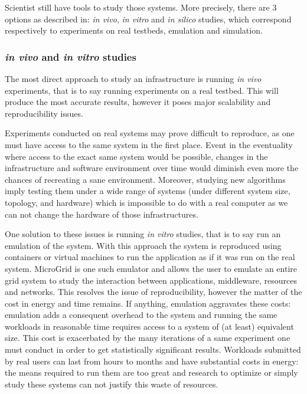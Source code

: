 Scientist still have tools to study those systems. More precisely, there are 3
options as described in\cite{legrand2015scheduling}: \textit{in vivo},
\textit{in vitro} and \textit{in silico} studies, which correspond respectively
to experiments on real testbeds, emulation and simulation.  


\subsubsection{\textit{in vivo} and \textit{in vitro} studies}

The most direct approach to study an infrastructure is running \textit{in vivo}
experiments, that is to say running experiments on a real testbed. This will
produce the most accurate results, however it poses major scalability and
reproducibility issues.

Experiments conducted on real systems may prove difficult to reproduce, as one
must have access to the same system in the first place. Event in the
eventuality where access to the exact same system would be possible, changes in
the infrastructure and software environment over time would diminish even more
the chances of recreating a sane environment. Moreover, studying new algorithms
imply testing them under a wide range of systems (under different system size,
topology, and hardware) which is impossible to do with a real computer as we
can not change the hardware of those infrastructures.

One solution to these issues is running \textit{in vitro} studies, that is to
say run an emulation of the system. With this approach the system is reproduced
using containers or virtual machines to run the application as if it was run on
the real system. MicroGrid \cite{microgrid} is one such emulator and allows the
user to emulate an entire grid system to study the interaction between
applications, middleware, resources and networks. This resolves the issue of
reproducibility, however the matter of the cost in energy and time remains. If
anything, emulation aggravates these costs: emulation adds a consequent
overhead to the system and running the same workloads in reasonable time
requires access to a system of (at least) equivalent size.  This cost is
exacerbated by the many iterations of a same experiment one must conduct in
order to get statistically significant results.  Workloads submitted by real
users can last from hours to months and have substantial costs in energy: the
means required to run them are too great and research to optimize or simply
study these systems can not justify this waste of resources.

